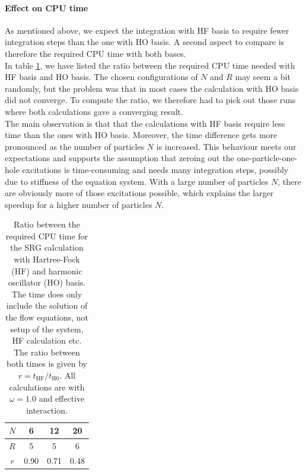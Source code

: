 \paragraph{Effect on CPU time}
As mentioned above, we expect the integration with HF basis to require fewer integration steps than the one with HO basis. A second aspect to compare is therefore the required CPU time with both bases.\\
In table \ref{tab:timeHF}, we have listed the ratio between the required CPU time needed with HF basis and HO basis.  The chosen configurations of $N$ and $R$ may seem a bit randomly, but the problem was that in most cases the calculation with HO basis did not converge. To compute the ratio, we therefore had to pick out those runs where both calculations gave a converging result.\\
The main observation is that that the calculations with HF basis require less time than the ones with HO basis. Moreover, the time difference gets more pronounced as the number of particles $N$ is increased.
This behaviour meets our expectations and supports the assumption that zeroing out the one-particle-one-hole excitations is time-consuming and needs many integration steps, possibly due to stiffness of the equation system. With a large number of particles $N$, there are obviously more of those excitations possible, which explains the larger speedup for a higher number of particles $N$.

\begin{table}
\begin{center}
\begin{tabular}{|c||ccc|}
\hline
$N$ & 6 & 12 & 20 \\
\hline
$R$ & 5 & 5 & 6 \\
\hline
$r$ & 0.90 & 0.71 & 0.48 \\
\hline
\end{tabular}
\end{center}
\caption{Ratio between the required CPU time for the SRG calculation with Hartree-Fock (HF) and harmonic oscillator (HO) basis. The time does only include the solution of the flow equations, not setup
of the system, HF calculation etc. The ratio between both times is given by $r = t_{\text{HF}}/t_{\text{H0}}$.
All calculations are with $\omega=1.0$ and effective interaction.}
\label{tab:timeHF}
\end{table}

 
